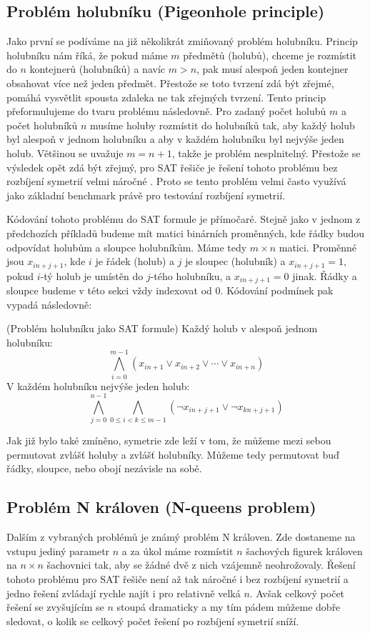 \subsection{Problém holubníku (Pigeonhole principle)}
Jako první se podíváme na již několikrát zmiňovaný problém holubníku. Princip holubníku nám říká, že pokud máme $m$ předmětů (holubů), chceme je rozmístit do $n$ kontejnerů (holubníků) a navíc $m>n$, pak musí alespoň jeden kontejner obsahovat více než jeden předmět. Přestože se toto tvrzení zdá být zřejmé, pomáhá vysvětlit spousta zdaleka ne tak zřejmých tvrzení. Tento princip přeformulujeme do tvaru problému následovně. Pro zadaný počet holubů $m$ a počet holubníků $n$ musíme holuby rozmístit do holubníků tak, aby každý holub byl alespoň v jednom holubníku a aby v každém holubníku byl nejvýše jeden holub. Většinou se uvažuje $m=n+1$, takže je problém nesplnitelný. Přestože se výsledek opět zdá být zřejmý, pro SAT řešiče je řešení tohoto problému bez rozbíjení symetrií velmi náročné \cite{haken85}. Proto se tento problém velmi často využívá jako základní benchmark právě pro testování rozbíjení symetrií.

Kódování tohoto problému do SAT formule je přímočaré. Stejně jako v jednom z předchozích příkladů budeme mít matici binárních proměnných, kde řádky budou odpovídat holubům a sloupce holubníkům. Máme tedy $m\times n$ matici. Proměnné jsou $x_{in+j+1}$, kde $i$ je řádek (holub) a $j$ je sloupec (holubník) a $x_{in+j+1} = 1$, pokud $i$-tý holub je umístěn do $j$-tého holubníku, a $x_{in+j+1}=0$ jinak. Řádky a sloupce budeme v této sekci vždy indexovat od $0$. Kódování podmínek pak vypadá následovně:

\begin{pozn}{(Problém holubníku jako SAT formule)}
Každý holub v alespoň jednom holubníku: \[
\bigwedge_{i=0}^{m-1}
\left(
x_{in+1} \vee x_{in+2} \vee \cdots \vee x_{in+n}
\right)
\]
V každém holubníku nejvýše jeden holub: 
\[
\bigwedge_{j=0}^{n-1}
\bigwedge_{0 \le i < k \le m-1}
\left(
\neg x_{in+j+1} \vee \neg x_{kn+j+1}
\right)
\]
\end{pozn}

Jak již bylo také zmíněno, symetrie zde leží v tom, že můžeme mezi sebou permutovat zvlášť holuby a zvlášť holubníky. Můžeme tedy permutovat buď řádky, sloupce, nebo obojí nezávisle na sobě.

\subsection{Problém N královen (N-queens problem)}
Dalším z vybraných problémů je známý problém N královen. Zde dostaneme na vstupu jediný parametr $n$ a za úkol máme rozmístit $n$ šachových figurek královen na $n\times n$ šachovnici tak, aby se žádné dvě z nich vzájemně neohrožovaly. Řešení tohoto problému pro SAT řešiče není až tak náročné i bez rozbíjení symetrií a jedno řešení zvládají rychle najít i pro relativně velká $n$. Avšak celkový počet řešení se zvyšujícím se $n$ stoupá dramaticky a my tím pádem můžeme dobře sledovat, o kolik se celkový počet řešení po rozbíjení symetrií sníží.

